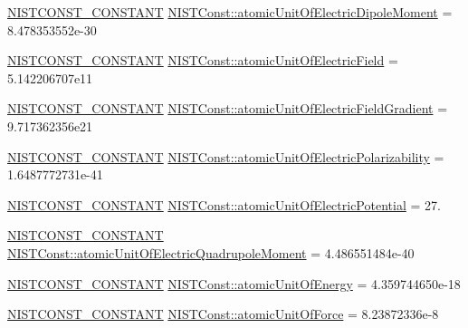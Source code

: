 \begin{DoxyCompactItemize}
\item 
\mbox{\hyperlink{_n_i_s_t_const_8hpp_a2b0fc1d7452373f816175dd86ce26729}{N\+I\+S\+T\+C\+O\+N\+S\+T\+\_\+\+C\+O\+N\+S\+T\+A\+NT}} \mbox{\hyperlink{group___n_i_s_t_const-_atomic_unit_ga9d0aa0f462c3cbf3000181f1f4dc2e97}{N\+I\+S\+T\+Const\+::atomic\+Unit\+Of\+Electric\+Dipole\+Moment}} = 8.\+478353552e-\/30
\item 
\mbox{\hyperlink{_n_i_s_t_const_8hpp_a2b0fc1d7452373f816175dd86ce26729}{N\+I\+S\+T\+C\+O\+N\+S\+T\+\_\+\+C\+O\+N\+S\+T\+A\+NT}} \mbox{\hyperlink{group___n_i_s_t_const-_atomic_unit_ga5d6c6686a6a6ea451d3cb975878f623a}{N\+I\+S\+T\+Const\+::atomic\+Unit\+Of\+Electric\+Field}} = 5.\+142206707e11
\item 
\mbox{\hyperlink{_n_i_s_t_const_8hpp_a2b0fc1d7452373f816175dd86ce26729}{N\+I\+S\+T\+C\+O\+N\+S\+T\+\_\+\+C\+O\+N\+S\+T\+A\+NT}} \mbox{\hyperlink{group___n_i_s_t_const-_atomic_unit_ga02c36e91d6f95d818656270669d20926}{N\+I\+S\+T\+Const\+::atomic\+Unit\+Of\+Electric\+Field\+Gradient}} = 9.\+717362356e21
\item 
\mbox{\hyperlink{_n_i_s_t_const_8hpp_a2b0fc1d7452373f816175dd86ce26729}{N\+I\+S\+T\+C\+O\+N\+S\+T\+\_\+\+C\+O\+N\+S\+T\+A\+NT}} \mbox{\hyperlink{group___n_i_s_t_const-_atomic_unit_ga635fe4831055d2787293d19a8134c0c7}{N\+I\+S\+T\+Const\+::atomic\+Unit\+Of\+Electric\+Polarizability}} = 1.\+6487772731e-\/41
\item 
\mbox{\hyperlink{_n_i_s_t_const_8hpp_a2b0fc1d7452373f816175dd86ce26729}{N\+I\+S\+T\+C\+O\+N\+S\+T\+\_\+\+C\+O\+N\+S\+T\+A\+NT}} \mbox{\hyperlink{group___n_i_s_t_const-_atomic_unit_gaabb37ce172d4f7c491b79ac27db120da}{N\+I\+S\+T\+Const\+::atomic\+Unit\+Of\+Electric\+Potential}} = 27.
\item 
\mbox{\hyperlink{_n_i_s_t_const_8hpp_a2b0fc1d7452373f816175dd86ce26729}{N\+I\+S\+T\+C\+O\+N\+S\+T\+\_\+\+C\+O\+N\+S\+T\+A\+NT}} \mbox{\hyperlink{group___n_i_s_t_const-_atomic_unit_ga4714cce6077b09c5fd2dbcb3efa95d5b}{N\+I\+S\+T\+Const\+::atomic\+Unit\+Of\+Electric\+Quadrupole\+Moment}} = 4.\+486551484e-\/40
\item 
\mbox{\hyperlink{_n_i_s_t_const_8hpp_a2b0fc1d7452373f816175dd86ce26729}{N\+I\+S\+T\+C\+O\+N\+S\+T\+\_\+\+C\+O\+N\+S\+T\+A\+NT}} \mbox{\hyperlink{group___n_i_s_t_const-_atomic_unit_gafa7ea08448d60570f5a6f2c6938bc8fc}{N\+I\+S\+T\+Const\+::atomic\+Unit\+Of\+Energy}} = 4.\+359744650e-\/18
\item 
\mbox{\hyperlink{_n_i_s_t_const_8hpp_a2b0fc1d7452373f816175dd86ce26729}{N\+I\+S\+T\+C\+O\+N\+S\+T\+\_\+\+C\+O\+N\+S\+T\+A\+NT}} \mbox{\hyperlink{group___n_i_s_t_const-_atomic_unit_gaf1da533cf2e7a57f1b0b87613ddea807}{N\+I\+S\+T\+Const\+::atomic\+Unit\+Of\+Force}} = 8.\+23872336e-\/8

\end{DoxyCompactItemize}
